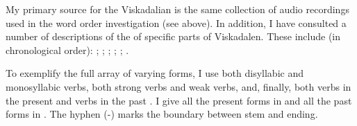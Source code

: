\documentclass[output=paper,colorlinks,citecolor=brown,draft,draftmode]{langscibook}
\begin{document}
My primary source for the Viskadalian  is the same collection of audio recordings used in the word order investigation (see  above). In addition, I have consulted a number of descriptions of the  of specific parts of Viskadalen. These include (in chronological order): \citet{Moller1858}; \citet{Belfrage1871}; \citet{Andersson1922}; \citet{Kalen1923}; \citet{Lindberg1927}; \citet{GotlindLandtmanson1950}.



To exemplify the full array of varying forms, I use both disyllabic and monosyllabic verbs, both strong verbs and weak verbs, and, finally, both verbs in the present  and verbs in the past . I give all the present  forms in  and all the past  forms in . The hyphen (-) marks the boundary between stem and ending.


\begin{table}
\caption{\label{tab:petzell:2a}Viskadalian present tense inflection}
\end{table}
\end{document}
